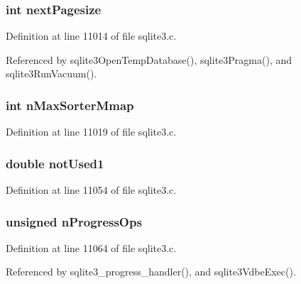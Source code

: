 \subsubsection[{next\+Pagesize}]{\setlength{\rightskip}{0pt plus 5cm}int next\+Pagesize}\label{structsqlite3_adb50d6f96dfed28c834af4ae15a2a32a}


Definition at line 11014 of file sqlite3.\+c.



Referenced by sqlite3\+Open\+Temp\+Database(), sqlite3\+Pragma(), and sqlite3\+Run\+Vacuum().

\hypertarget{structsqlite3_ae21ed7e6503a77663f41c62115af6652}{}
\subsubsection[{n\+Max\+Sorter\+Mmap}]{\setlength{\rightskip}{0pt plus 5cm}int n\+Max\+Sorter\+Mmap}\label{structsqlite3_ae21ed7e6503a77663f41c62115af6652}


Definition at line 11019 of file sqlite3.\+c.

\hypertarget{structsqlite3_acfa5801727aa03ab8fb7c861fbcb9e6f}{}
\subsubsection[{not\+Used1}]{\setlength{\rightskip}{0pt plus 5cm}double not\+Used1}\label{structsqlite3_acfa5801727aa03ab8fb7c861fbcb9e6f}


Definition at line 11054 of file sqlite3.\+c.

\hypertarget{structsqlite3_a8bcbc09963dda43f5398e601ffaa50c6}{}
\subsubsection[{n\+Progress\+Ops}]{\setlength{\rightskip}{0pt plus 5cm}unsigned n\+Progress\+Ops}\label{structsqlite3_a8bcbc09963dda43f5398e601ffaa50c6}


Definition at line 11064 of file sqlite3.\+c.



Referenced by sqlite3\+\_\+progress\+\_\+handler(), and sqlite3\+Vdbe\+Exec().

